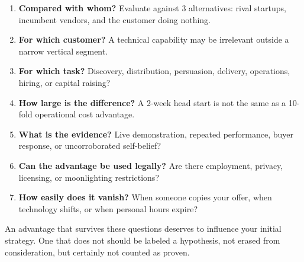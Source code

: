 \begin{enumerate}[label=\textbf{\arabic*.},leftmargin=11pt,itemsep=1.5pt,topsep=1.5pt,parsep=0pt]
  \item \textbf{Compared with whom?} Evaluate against 3 alternatives: rival startups, incumbent vendors, and the customer doing nothing.
  \item \textbf{For which customer?} A technical capability may be irrelevant outside a narrow vertical segment.
  \item \textbf{For which task?} Discovery, distribution, persuasion, delivery, operations, hiring, or capital raising?
  \item \textbf{How large is the difference?} A 2-week head start is not the same as a 10-fold operational cost advantage.
  \item \textbf{What is the evidence?} Live demonstration, repeated performance, buyer response, or uncorroborated self-belief?
  \item \textbf{Can the advantage be used legally?} Are there employment, privacy, licensing, or moonlighting restrictions?
  \item \textbf{How easily does it vanish?} When someone copies your offer, when technology shifts, or when personal hours expire?
\end{enumerate}

An advantage that survives these questions deserves to influence your initial strategy. One that does not should be labeled a hypothesis, not erased from consideration, but certainly not counted as proven.
